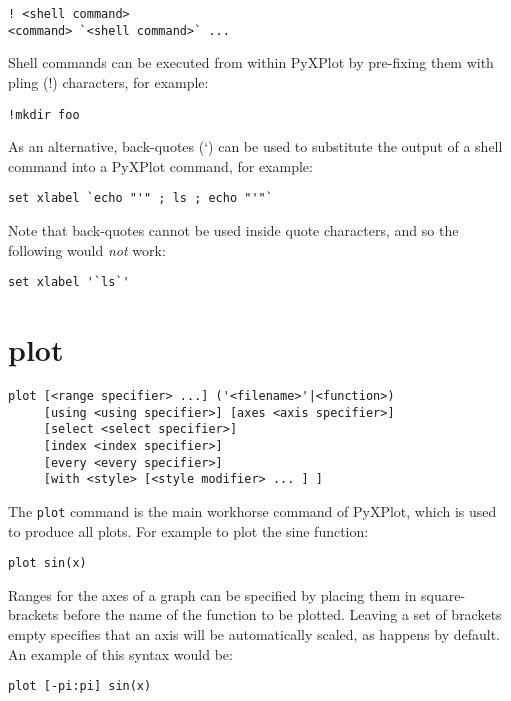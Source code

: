 \documentclass[a4paper,onecolumn,11pt]{book}
\begin{document}
\begin{verbatim}
! <shell command>
<command> `<shell command>` ...
\end{verbatim}

Shell commands can be executed from within PyXPlot by pre-fixing them with
pling (!) characters, for example:

\begin{verbatim}
!mkdir foo
\end{verbatim}

As an alternative, back-quotes (`) can be used to substitute the output of a
shell command into a PyXPlot command, for example:

\begin{verbatim}
set xlabel `echo "'" ; ls ; echo "'"`
\end{verbatim}

Note that back-quotes cannot be used inside quote characters, and so the
following would \textit{not} work:

\begin{verbatim}
set xlabel '`ls`'
\end{verbatim}


\section{plot}

\begin{verbatim}
plot [<range specifier> ...] ('<filename>'|<function>)
     [using <using specifier>] [axes <axis specifier>]
     [select <select specifier>]
     [index <index specifier>]
     [every <every specifier>]
     [with <style> [<style modifier> ... ] ]
\end{verbatim}

The {\tt plot} command is the main workhorse command of PyXPlot, which is used
to produce all plots. For example to plot the sine function:

\begin{verbatim}
plot sin(x)
\end{verbatim}

Ranges for the axes of a graph can be specified by placing them in
square-brackets before the name of the function to be plotted. Leaving a set of
brackets empty specifies that an axis will be automatically scaled, as happens
by default. An example of this syntax would be:

\begin{verbatim}
plot [-pi:pi] sin(x)
\end{verbatim}
\end{document}
